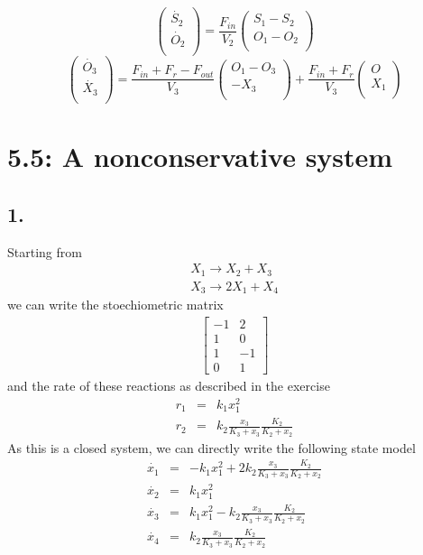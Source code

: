 \begin{flushleft}

$$\begin{pmatrix}
\dot{S_{2}}\\
\dot{O_{2}}\\
\end{pmatrix}=
\dfrac{F_{in}}{V_{2}}\begin{pmatrix}
S_{1}-S_{2}\\
O_{1}-O_{2}\\
\end{pmatrix}$$
$$\begin{pmatrix}
\dot{O_{3}}\\
\dot{X_{3}}\\
\end{pmatrix}=
\dfrac{F_{in}+F_{r}-F_{out}}{V_{3}}\begin{pmatrix}
O_{1}-O_{3}\\
-X_{3}\\
\end{pmatrix}+
\dfrac{F_{in}+F_{r}}{V_{3}}
\begin{pmatrix}
O\\
X_{1}\\
\end{pmatrix}
$$




\section*{5.5: A nonconservative system}
\subsection*{1.}
Starting from
\begin{eqnarray*}
X_1\rightarrow X_2+X_3 \\
X_3\rightarrow 2X_1+X_4
\end{eqnarray*}
we can write the stoechiometric matrix
\begin{eqnarray*}
\begin{bmatrix}
-1 & 2 \\
1 & 0 \\
1 & -1 \\
0 & 1
\end{bmatrix}
\end{eqnarray*}
and the rate of these reactions as described in the exercise
\begin{eqnarray*}
r_1 &=& k_1 x_1^2\\
r_2 &=& k_2 \frac{x_3}{K_3+x_3}\frac{K_2}{K_2+x_2}
\end{eqnarray*}
As this is a closed system, we can directly write the following state model
\begin{eqnarray*}
\dot{x_1} &=& - k_1 x_1^2 + 2k_2 \frac{x_3}{K_3+x_3}\frac{K_2}{K_2+x_2} \\
\dot{x_2} &=& k_1 x_1^2  \\
\dot{x_3} &=& k_1 x_1^2 - k_2 \frac{x_3}{K_3+x_3}\frac{K_2}{K_2+x_2} \\
\dot{x_4} &=& k_2 \frac{x_3}{K_3+x_3}\frac{K_2}{K_2+x_2}
\end{eqnarray*}



\end{flushleft}
